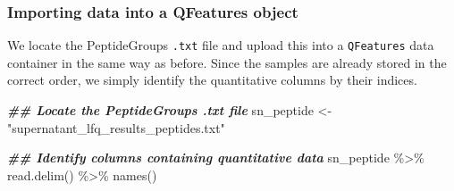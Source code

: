 \documentclass[9pt,a4paper,]{extarticle}
\newenvironment{Shaded}{\begin{snugshade}}{\end{snugshade}}
\newcommand{\DocumentationTok}[1]{\textcolor[rgb]{0.56,0.35,0.01}{\textbf{\textit{#1}}}}
\newcommand{\FunctionTok}[1]{\textcolor[rgb]{0.00,0.00,0.00}{#1}}
\newcommand{\NormalTok}[1]{#1}
\newcommand{\OtherTok}[1]{\textcolor[rgb]{0.56,0.35,0.01}{#1}}
\newcommand{\SpecialCharTok}[1]{\textcolor[rgb]{0.00,0.00,0.00}{#1}}
\newcommand{\StringTok}[1]{\textcolor[rgb]{0.31,0.60,0.02}{#1}}
\begin{document}
\hypertarget{importing-data-into-a-qfeatures-object}{%
\subsubsection{Importing data into a QFeatures object}\label{importing-data-into-a-qfeatures-object}}

We locate the PeptideGroups \texttt{.txt} file and upload this into a \texttt{QFeatures} data
container in the same way as before. Since the samples are already stored in the
correct order, we simply identify the quantitative columns by their indices.

\begin{Shaded}
\begin{Highlighting}[]
\DocumentationTok{\#\# Locate the PeptideGroups .txt file}
\NormalTok{sn\_peptide }\OtherTok{\textless{}{-}} \StringTok{"supernatant\_lfq\_results\_peptides.txt"}

\DocumentationTok{\#\# Identify columns containing quantitative data}
\NormalTok{sn\_peptide }\SpecialCharTok{\%\textgreater{}\%}
  \FunctionTok{read.delim}\NormalTok{() }\SpecialCharTok{\%\textgreater{}\%}
  \FunctionTok{names}\NormalTok{()}
\end{Highlighting}
\end{Shaded}
\end{document}
